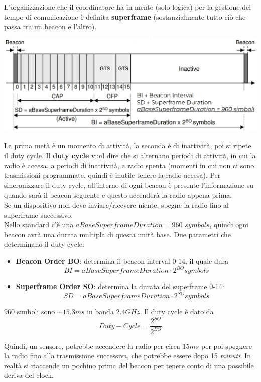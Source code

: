 \newpage

L'organizzazione che il coordinatore ha in mente (solo logica) per la gestione del tempo di comunicazione è definita \textbf{superframe} (sostanzialmente tutto ciò che passa tra un beacon e l'altro).
\begin{center}
	\includegraphics[width=0.98\linewidth]{img/wpan/zsuperframe}
\end{center}
La prima metà è un momento di attività, la seconda è di inattività, poi si ripete il duty cycle. Il \textbf{duty cycle} vuol dire che si alternano periodi di attività, in cui la radio è accesa, a periodi di inattività, a radio spenta (momenti in cui non ci sono trasmissioni programmate, quindi è inutile tenere la radio accesa). Per sincronizzare il duty cycle, all'interno di ogni beacon è presente l'informazione su quando sarà il beacon seguente e questo accenderà la radio appena prima.\\
Se un dispositivo non deve inviare/ricevere niente, spegne la radio fino al superframe successivo.\\

Nello standard c'è una $aBaseSuperframeDuration = 960$ $symbols$, quindi ogni beacon avrà una durata multipla di questa unità base. Due parametri che determinano il duty cycle: 
\begin{itemize}
	\item \textbf{Beacon Order BO}: determina il beacon interval 0-14, il quale dura
	$$ BI = aBaseSuperframeDuration \cdot 2^{BO} symbols $$
	\item \textbf{Superframe Order SO}: determina la durata del superframe 0-14: 
	$$ SD = aBaseSuperframeDuration \cdot 2^{SO} symbols $$
\end{itemize}
$960$ simboli sono $\sim 15.3 ms$ in banda $2.4 GHz$. Il duty cycle è dato da 
$$ Duty-Cycle = \frac{2^{SO}}{2^{BO}} $$

Quindi, un sensore, potrebbe accendere la radio per circa $15ms$ per poi spegnere la radio fino alla trasmissione successiva, che potrebbe essere dopo 15 \textit{minuti}. In realtà si riaccende un pochino prima del beacon per tenere conto di una possibile deriva del clock.\\

